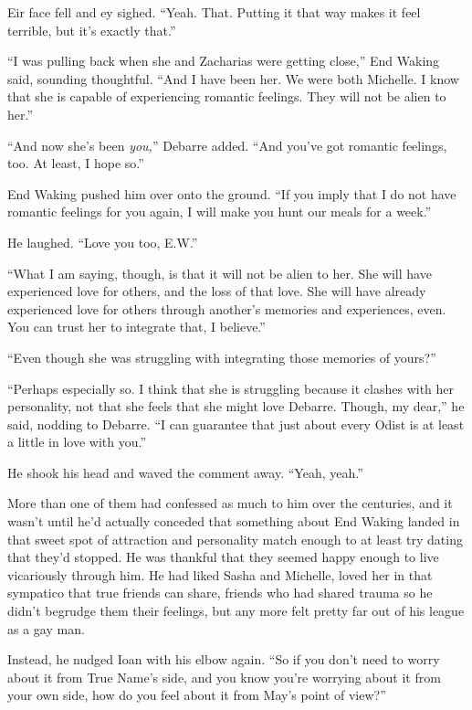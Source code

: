 Eir face fell and ey sighed. ``Yeah. That. Putting it that way makes it feel terrible, but it's exactly that.''

``I was pulling back when she and Zacharias were getting close,'' End Waking said, sounding thoughtful. ``And I have been her. We were both Michelle. I know that she is capable of experiencing romantic feelings. They will not be alien to her.''

``And now she's been \emph{you,}'' Debarre added. ``And you've got romantic feelings, too. At least, I hope so.''

End Waking pushed him over onto the ground. ``If you imply that I do not have romantic feelings for you again, I will make you hunt our meals for a week.''

He laughed. ``Love you too, E.W.''

``What I am saying, though, is that it will not be alien to her. She will have experienced love for others, and the loss of that love. She will have already experienced love for others through another's memories and experiences, even. You can trust her to integrate that, I believe.''

``Even though she was struggling with integrating those memories of yours?''

``Perhaps especially so. I think that she is struggling because it clashes with her personality, not that she feels that she might love Debarre. Though, my dear,'' he said, nodding to Debarre. ``I can guarantee that just about every Odist is at least a little in love with you.''

He shook his head and waved the comment away. ``Yeah, yeah.''

More than one of them had confessed as much to him over the centuries, and it wasn't until he'd actually conceded that something about End Waking landed in that sweet spot of attraction and personality match enough to at least try dating that they'd stopped. He was thankful that they seemed happy enough to live vicariously through him. He had liked Sasha and Michelle, loved her in that sympatico that true friends can share, friends who had shared trauma so he didn't begrudge them their feelings, but any more felt pretty far out of his league as a gay man.

Instead, he nudged Ioan with his elbow again. ``So if you don't need to worry about it from True Name's side, and you know you're worrying about it from your own side, how do you feel about it from May's point of view?''

